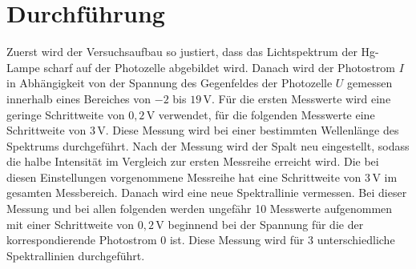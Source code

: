 \section{Durchführung}
\label{sec:Durchführung}
Zuerst wird der Versuchsaufbau so justiert, dass das Lichtspektrum der Hg-Lampe scharf auf der Photozelle abgebildet wird. 
Danach wird der Photostrom $I$ in Abhängigkeit von der Spannung des Gegenfeldes der Photozelle $U$ gemessen innerhalb eines Bereiches von $-2$ bis 
$19 \, \unit{\volt}$. Für die ersten Messwerte wird eine geringe Schrittweite von $0,2 \, \unit{\volt}$ verwendet, für die folgenden Messwerte
eine Schrittweite von $3 \, \unit{\volt}$. Diese Messung wird bei einer bestimmten Wellenlänge des Spektrums durchgeführt. 
Nach der Messung wird der Spalt neu eingestellt, sodass die halbe Intensität im Vergleich zur ersten Messreihe erreicht wird. 
Die bei diesen Einstellungen vorgenommene Messreihe hat eine Schrittweite von $3 \, \unit{\volt}$ im gesamten Messbereich. 
Danach wird eine neue Spektrallinie vermessen. Bei dieser Messung und bei allen folgenden werden ungefähr 10 Messwerte aufgenommen 
mit einer Schrittweite von $0,2 \, \unit{\volt}$ beginnend bei der Spannung für die der korrespondierende Photostrom $0$ ist. 
Diese Messung wird für $3$ unterschiedliche Spektrallinien durchgeführt. 